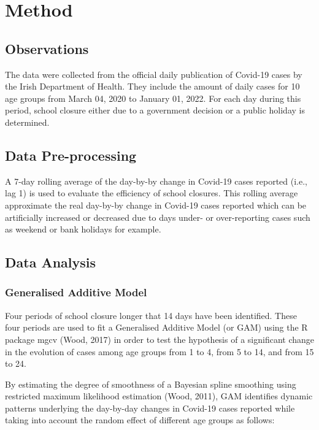 \documentclass[]{elsarticle} %
\begin{document}
\hypertarget{method}{%
\section{Method}\label{method}}

\hypertarget{observations}{%
\subsection{Observations}\label{observations}}

The data were collected from the official daily publication of Covid-19 cases by the Irish Department of Health. They include the amount of daily cases for 10 age groups from March 04, 2020 to January 01, 2022. For each day during this period, school closure either due to a government decision or a public holiday is determined.

\hypertarget{data-pre-processing}{%
\subsection{Data Pre-processing}\label{data-pre-processing}}

A 7-day rolling average of the day-by-by change in Covid-19 cases reported (i.e., lag 1) is used to evaluate the efficiency of school closures. This rolling average approximate the real day-by-by change in Covid-19 cases reported which can be artificially increased or decreased due to days under- or over-reporting cases such as weekend or bank holidays for example.

\hypertarget{data-analysis}{%
\subsection{Data Analysis}\label{data-analysis}}

\hypertarget{generalised-additive-model}{%
\subsubsection{Generalised Additive Model}\label{generalised-additive-model}}

Four periods of school closure longer that 14 days have been identified. These four periods are used to fit a Generalised Additive Model (or GAM) using the R package mgcv (Wood, 2017) in order to test the hypothesis of a significant change in the evolution of cases among age groups from 1 to 4, from 5 to 14, and from 15 to 24.

By estimating the degree of smoothness of a Bayesian spline smoothing using restricted maximum likelihood estimation (Wood, 2011), GAM identifies dynamic patterns underlying the day-by-day changes in Covid-19 cases reported while taking into account the random effect of different age groups as follows:
\end{document}
